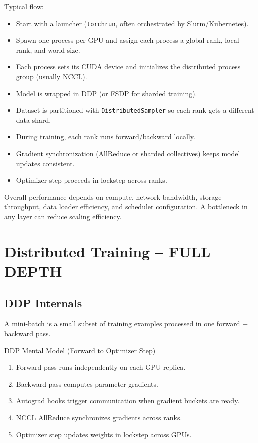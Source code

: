 \documentclass[12pt]{article}
\begin{document}
Typical flow:
\begin{itemize}
\item Start with a launcher (\texttt{torchrun}, often orchestrated by Slurm/Kubernetes).
\item Spawn one process per GPU and assign each process a global rank, local rank, and world size.
\item Each process sets its CUDA device and initializes the distributed process group (usually NCCL).
\item Model is wrapped in DDP (or FSDP for sharded training).
\item Dataset is partitioned with \texttt{DistributedSampler} so each rank gets a different data shard.
\item During training, each rank runs forward/backward locally.
\item Gradient synchronization (AllReduce or sharded collectives) keeps model updates consistent.
\item Optimizer step proceeds in lockstep across ranks.
\end{itemize}

Overall performance depends on compute, network bandwidth, storage throughput, data loader efficiency, and scheduler configuration. A bottleneck in any layer can reduce scaling efficiency.

\section{Distributed Training -- FULL DEPTH}

\subsection{DDP Internals}

A mini-batch is a small subset of training examples processed in one forward + backward pass.

\begin{bluebox}{DDP Mental Model (Forward to Optimizer Step)}
\begin{enumerate}[leftmargin=1.3em]
\item Forward pass runs independently on each GPU replica.
\item Backward pass computes parameter gradients.
\item Autograd hooks trigger communication when gradient buckets are ready.
\item NCCL AllReduce synchronizes gradients across ranks.
\item Optimizer step updates weights in lockstep across GPUs.
\end{enumerate}
\end{bluebox}
\end{document}
